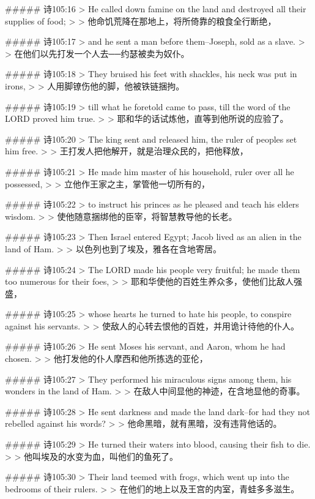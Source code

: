 ##### 诗105:16
> He called down famine on the land and destroyed all their supplies of food;
>
> 他命饥荒降在那地上，将所倚靠的粮食全行断绝，


##### 诗105:17
> and he sent a man before them--Joseph, sold as a slave.
>
> 在他们以先打发一个人去──约瑟被卖为奴仆。


##### 诗105:18
> They bruised his feet with shackles, his neck was put in irons,
>
> 人用脚镣伤他的脚，他被铁链捆拘。


##### 诗105:19
> till what he foretold came to pass, till the word of the LORD proved him true.
>
> 耶和华的话试炼他，直等到他所说的应验了。


##### 诗105:20
> The king sent and released him, the ruler of peoples set him free.
>
> 王打发人把他解开，就是治理众民的，把他释放，


##### 诗105:21
> He made him master of his household, ruler over all he possessed,
>
> 立他作王家之主，掌管他一切所有的，


##### 诗105:22
> to instruct his princes as he pleased and teach his elders wisdom.
>
> 使他随意捆绑他的臣宰，将智慧教导他的长老。


##### 诗105:23
> Then Israel entered Egypt; Jacob lived as an alien in the land of Ham.
>
> 以色列也到了埃及，雅各在含地寄居。


##### 诗105:24
> The LORD made his people very fruitful; he made them too numerous for their foes,
>
> 耶和华使他的百姓生养众多，使他们比敌人强盛，


##### 诗105:25
> whose hearts he turned to hate his people, to conspire against his servants.
>
> 使敌人的心转去恨他的百姓，并用诡计待他的仆人。


##### 诗105:26
> He sent Moses his servant, and Aaron, whom he had chosen.
>
> 他打发他的仆人摩西和他所拣选的亚伦，


##### 诗105:27
> They performed his miraculous signs among them, his wonders in the land of Ham.
>
> 在敌人中间显他的神迹，在含地显他的奇事。


##### 诗105:28
> He sent darkness and made the land dark--for had they not rebelled against his words?
>
> 他命黑暗，就有黑暗，没有违背他话的。


##### 诗105:29
> He turned their waters into blood, causing their fish to die.
>
> 他叫埃及的水变为血，叫他们的鱼死了。


##### 诗105:30
> Their land teemed with frogs, which went up into the bedrooms of their rulers.
>
> 在他们的地上以及王宫的内室，青蛙多多滋生。


